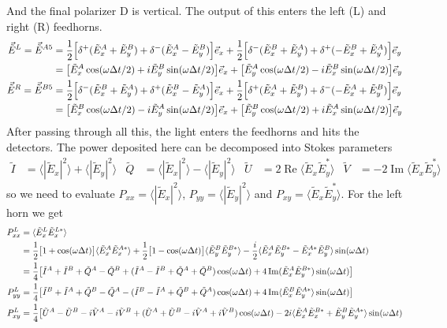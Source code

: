 \documentclass{article}
\newcommand{\I}{\tilde I}
\newcommand{\Q}{\tilde Q}
\newcommand{\U}{\tilde U}
\newcommand{\V}{\tilde V}
\newcommand{\J}{{\tilde E}}
\renewcommand{\Re}{\operatorname{Re}}
\renewcommand{\Im}{\operatorname{Im}}
\begin{document}
And the final polarizer D is vertical. The output of this enters
the left (L) and right (R) feedhorns.
\begin{align}
	\vec \J^L = \vec \J^{A5} &= \frac12 \Big[\delta^+(\J^A_x+\J^B_y)+\delta^-(\J^A_x-\J^B_y)\Big]\vec e_x
		+ \frac12 \Big[\delta^-(\J^B_x+\J^A_y)+\delta^+(-\J^B_x+\J^A_y)\Big]\vec e_y \notag \\
		&= \big[\J^A_x\cos(\omega\Delta t/2) + i\J^B_y\sin(\omega\Delta t/2)\big]\vec e_x
		+  \big[\J^A_y\cos(\omega\Delta t/2) - i\J^B_x\sin(\omega\Delta t/2)\big]\vec e_y \\
	\vec \J^R = \vec \J^{B5} &= \frac12 \Big[\delta^-(\J^B_x+\J^A_y)+\delta^+(\J^B_x-\J^A_y)\Big]\vec e_x
		+ \frac12 \Big[\delta^+(\J^A_x+\J^B_y)+\delta^-(-\J^A_x+\J^B_y)\Big]\vec e_y \notag \\
		&= \big[\J^B_x\cos(\omega\Delta t/2) - i\J^A_y\sin(\omega\Delta t/2)\big]\vec e_x
		+  \big[\J^B_y\cos(\omega\Delta t/2) + i\J^A_x\sin(\omega\Delta t/2)\big]\vec e_y
\end{align}
After passing through all this, the light enters the feedhorns and
hits the detectors. The power deposited here can be decomposed into
Stokes parameters
\begin{align}
	\I &= \langle |\J_x|^2\rangle + \langle|\J_y|^2\rangle &
	\Q &= \langle |\J_x|^2\rangle - \langle|\J_y|^2\rangle &
	\U &= 2\Re\langle \J_x\J_y^*\rangle &
	\V &= -2\Im\langle \J_x\J_y^*\rangle
\end{align}
so we need to evaluate $P_{xx} = \langle |\J_x|^2\rangle$,
$P_{yy} = \langle |\J_y|^2\rangle$ and $P_{xy} = \langle \J_x\J_y^*\rangle$.
For the left horn we get
\begin{align}
	P^L_{xx} &= \langle \J^L_x\J^{L*}_x \rangle \notag \\
		&= \frac12\big[1+\cos(\omega\Delta t)\big]\langle\J^A_x\J^{A*}_x\rangle
		+ \frac12\big[1-\cos(\omega\Delta t)\big]\langle\J^B_y\J^{B*}_y\rangle
		- \frac{i}2\langle\J^A_x\J^{B*}_y - \J^{A*}_x\J^B_y\rangle\sin(\omega\Delta t) \notag \\
		&= \frac14\big[\I^A+\I^B+\Q^A-\Q^B + (\I^A-\I^B+\Q^A+\Q^B)\cos(\omega\Delta t) +
		4\Im(\J^A_x\J^{B*}_y)\sin(\omega\Delta t) \big] \\
	P^L_{yy} &= \frac14\big[\I^B+\I^A+\Q^B-\Q^A - (\I^B-\I^A+\Q^B+\Q^A)\cos(\omega\Delta t) +
		4\Im\langle\J^B_x\J^{A*}_y\rangle\sin(\omega\Delta t) \big ]\\
	P^L_{xy} &= \frac14\big[\U^A-\U^B - i\V^A-i\V^B + (\U^A+\U^B -i\V^A+i\V^B)\cos(\omega\Delta t)
		-2i\langle\J^A_x\J^{B*}_x+\J^B_y\J^{A*}_y\rangle\sin(\omega\Delta t)
\end{align}
\end{document}
